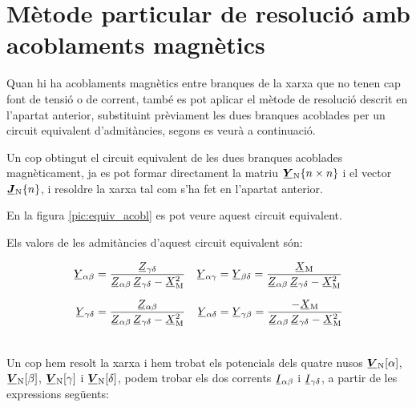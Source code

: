 \section{Mètode particular de resolució amb acoblaments magnètics}

Quan hi ha acoblaments magnètics entre branques de la xarxa que no
tenen cap font de tensió o de corrent, també es pot aplicar el
mètode de resolució descrit en l'apartat anterior, substituint
prèviament les dues branques acoblades per un circuit equivalent
d'admitàncies, segons es veurà a continuació. 

Un cop obtingut el circuit equivalent de les dues branques acoblades
magnèticament, ja es pot formar directament la matriu $\mcmplx{Y}\ped{N}\{n \times n\}$ i
el vector $\mcmplx{J}\ped{N}\{n\}$, i  resoldre la xarxa tal com s'ha fet en
l'apartat anterior.

En la figura \vref{pic:equiv_acobl} es pot veure aquest circuit
equivalent.
\begin{center}
\centering
   
    \label{pic:equiv_acobl}
\end{center}

Els valors de les admitàncies d'aquest circuit equivalent
són:

\parbox{15cm}
{ \begin{align*}
   \cmplx{Y}_{\alpha\beta} &= \frac{\cmplx{Z}_{\gamma\delta}}{\cmplx{Z}_{\alpha\beta}\, \cmplx{Z}_{\gamma\delta}-\cmplx{X}\ped{M}^2} &
   \cmplx{Y}_{\alpha\gamma} &= \cmplx{Y}_{\beta\delta} = \frac{\cmplx{X}\ped{M}}{\cmplx{Z}_{\alpha\beta}\, \cmplx{Z}_{\gamma\delta}-\cmplx{X}\ped{M}^2} \\[1.5ex]
   \cmplx{Y}_{\gamma\delta} &= \frac{\cmplx{Z}_{\alpha\beta}}{\cmplx{Z}_{\alpha\beta}\, \cmplx{Z}_{\gamma\delta}-\cmplx{X}\ped{M}^2} &
   \cmplx{Y}_{\alpha\delta} &= \cmplx{Y}_{\gamma\beta} = \frac{-\cmplx{X}\ped{M}}{\cmplx{Z}_{\alpha\beta}\, \cmplx{Z}_{\gamma\delta}-\cmplx{X}\ped{M}^2}
\end{align*} }
\hfill
\parbox{1cm}{\begin{align}\end{align}}

Un cop hem resolt la xarxa i hem trobat els potencials dels quatre
nusos $\mcmplx{V}\ped{N}[\alpha]$, $\mcmplx{V}\ped{N}[\beta]$,
$\mcmplx{V}\ped{N}[\gamma]$ i $\mcmplx{V}\ped{N}[\delta]$, podem
trobar els dos corrents $\cmplx{I}_{\alpha\beta}$ i
$\cmplx{I}_{\gamma\delta}$, a partir de les expressions següents:

